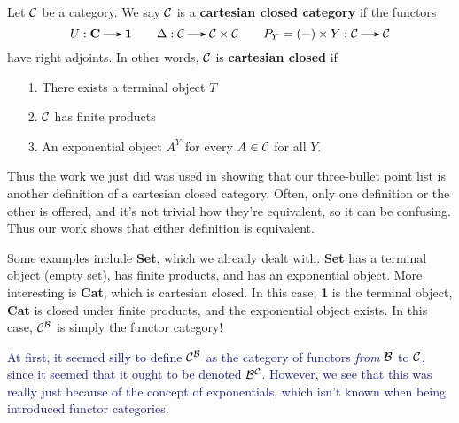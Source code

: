     \begin{definition}
        Let $\mathcal{C}$ be a category. We say $\mathcal{C}$ is a \textbf{cartesian closed 
        category} if the functors 
        \[
            U: \textbf{C} \to \textbf{1} 
            \qquad
            \Delta: \cc \to \cc  \times \cc 
            \qquad 
            P_Y = (-)\times Y: \cc \to \cc
        \]
        have right adjoints. In other words, $\mathcal{C}$ is 
        \textbf{cartesian closed} if 
        \begin{itemize}
            \item[1.] There exists a terminal object $T$ 
            \item[2.] $\mathcal{C}$ has finite products 
            \item[3.] An exponential object $A^Y$ for every $A \in
            \mathcal{C}$ for all $Y$.   
        \end{itemize}
    \end{definition}

    Thus the work we just did was used in showing that our
    three-bullet point list is another definition of a cartesian
    closed category. Often, only one definition or the other is
    offered, and it's not trivial how they're equivalent, so it can be
    confusing. Thus our work shows that either definition is
    equivalent. 

    Some examples include \textbf{Set}, which we already dealt with.
    \textbf{Set} has a terminal object (empty set), has finite
    products, and has an exponential object. More interesting is
    \textbf{Cat}, which is cartesian closed. In this case, \textbf{1}
    is the terminal object, \textbf{Cat} is closed under finite
    products, and the exponential object exists. In this case,
    $\mathcal{C}^{\mathcal{B}}$ is simply the functor category! 

    \textcolor{MidnightBlue}{At first, it seemed silly to define
    $\mathcal{C}^{\mathcal{B}}$ as the category of functors \textit{from} $\mathcal{B}$ to
    $\mathcal{C}$, since it seemed that it ought to be denoted $\mathcal{B}^{\mathcal{C}}$.
    However, we see that this was really just because of the concept
    of exponentials, which isn't known when being introduced functor
    categories.}
    